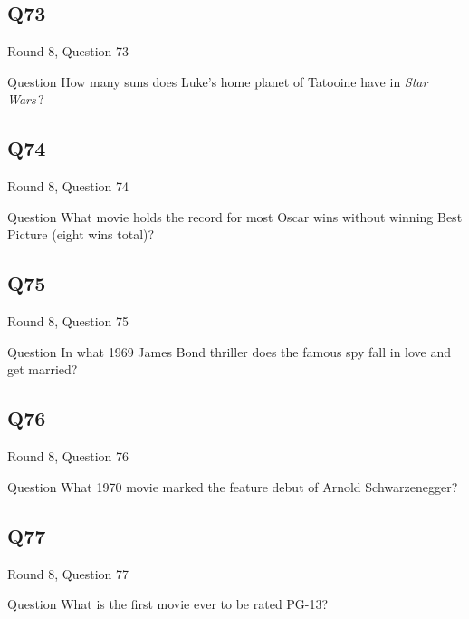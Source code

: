 \documentclass[11pt]{beamer}
\begin{document}
\subsection*{Q73}
\begin{frame}[t]{Round 8, Question 73}
\vspace{2em}
\begin{block}{Question}
How many suns does Luke's home planet of Tatooine have in \emph{Star Wars}\,?
\end{block}
\end{frame}
    

\subsection*{Q74}
\begin{frame}[t]{Round 8, Question 74}
\vspace{2em}
\begin{block}{Question}
What movie holds the record for most Oscar wins without winning Best Picture (eight wins total)?
\end{block}
\end{frame}
    

\subsection*{Q75}
\begin{frame}[t]{Round 8, Question 75}
\vspace{2em}
\begin{block}{Question}
In what 1969 James Bond thriller does the famous spy fall in love and get married?
\end{block}
\end{frame}
    

\subsection*{Q76}
\begin{frame}[t]{Round 8, Question 76}
\vspace{2em}
\begin{block}{Question}
What 1970 movie marked the feature debut of Arnold Schwarzenegger?
\end{block}
\end{frame}
    

\subsection*{Q77}
\begin{frame}[t]{Round 8, Question 77}
\vspace{2em}
\begin{block}{Question}
What is the first movie ever to be rated PG-13?
\end{block}
\end{frame}
    
\end{document}
